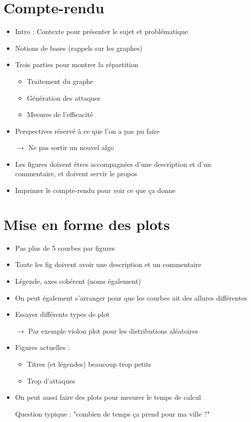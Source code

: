 \documentclass{article}
\begin{document}
\section*{Compte-rendu}
	\begin{itemize}
		\item Intro : Contexte pour présenter le sujet et problématique
		\item Notions de bases (rappels sur les graphes)
		\item Trois parties pour montrer la répartition \begin{itemize}
			\item Traitement du graphe
			\item Génération des attaques
			\item Mesures de l'efficacité
		\end{itemize}
		\item Perspectives réservé à ce que l'on a pas pu faire
		
		$\rightarrow$ Ne pas sortir un nouvel algo
		
		\item Les figures doivent êtres accompagnées d'une description et d'un commentaire, et doivent servir le propos
		\item Imprimer le compte-rendu pour voir ce que ça donne
	\end{itemize}

\section*{Mise en forme des plots}
	\begin{itemize}
		\item Pas plus de 5 courbes par figures
		\item Toute les fig doivent avoir une description et un commentaire
		\item Légende, axes cohérent (noms également)
		\item On peut également s'arranger pour que les courbes ait des allures différentes
		\item Essayer différents types de plot
		
		$\rightarrow$ Par exemple violon plot pour les distributions aléatoires
		\item Figures actuelles : \begin{itemize}
			\item Titres (et légendes) beaucoup trop petits
			\item Trop d'attaques
		\end{itemize}
		\item On peut aussi faire des plots pour mesurer le temps de calcul
		
		Question typique : "combien de temps ça prend pour ma  ville ?"
	\end{itemize}
\end{document}
